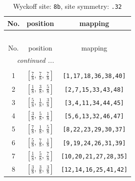 \documentclass[fleqn,8pt]{jsarticle}
\begin{document}
\begin{longtable}{ccc}
\caption{Wyckoff site: {\tt 8b}, site symmetry: {\tt .32}}
 \\
 \hline \hline
No. & position & mapping \\ \hline \endfirsthead

\multicolumn{2}{l}{\tablename\ \thetable{}} \\
 \hline \hline
No. & position & mapping \\ \hline \endhead

 \hline \hline
\multicolumn{2}{r}{\footnotesize\it continued ...} \\ \endfoot

 \hline \hline
\multicolumn{2}{r}{} \\ \endlastfoot

1 & $\left[ \frac{7}{8},\, \frac{7}{8},\, \frac{7}{8} \right]$ & {\tt [1,17,18,36,38,40]} \\ \hline
2 & $\left[ \frac{1}{8},\, \frac{3}{8},\, \frac{5}{8} \right]$ & {\tt [2,7,15,33,43,48]} \\ \hline
3 & $\left[ \frac{5}{8},\, \frac{1}{8},\, \frac{3}{8} \right]$ & {\tt [3,4,11,34,44,45]} \\ \hline
4 & $\left[ \frac{3}{8},\, \frac{5}{8},\, \frac{1}{8} \right]$ & {\tt [5,6,13,32,46,47]} \\ \hline
5 & $\left[ \frac{7}{8},\, \frac{1}{8},\, \frac{5}{8} \right]$ & {\tt [8,22,23,29,30,37]} \\ \hline
6 & $\left[ \frac{5}{8},\, \frac{7}{8},\, \frac{1}{8} \right]$ & {\tt [9,19,24,26,31,39]} \\ \hline
7 & $\left[ \frac{1}{8},\, \frac{5}{8},\, \frac{7}{8} \right]$ & {\tt [10,20,21,27,28,35]} \\ \hline
8 & $\left[ \frac{3}{8},\, \frac{3}{8},\, \frac{3}{8} \right]$ & {\tt [12,14,16,25,41,42]} \\
\end{longtable}
\renewcommand{\arraystretch}{1.2}
\end{document}
